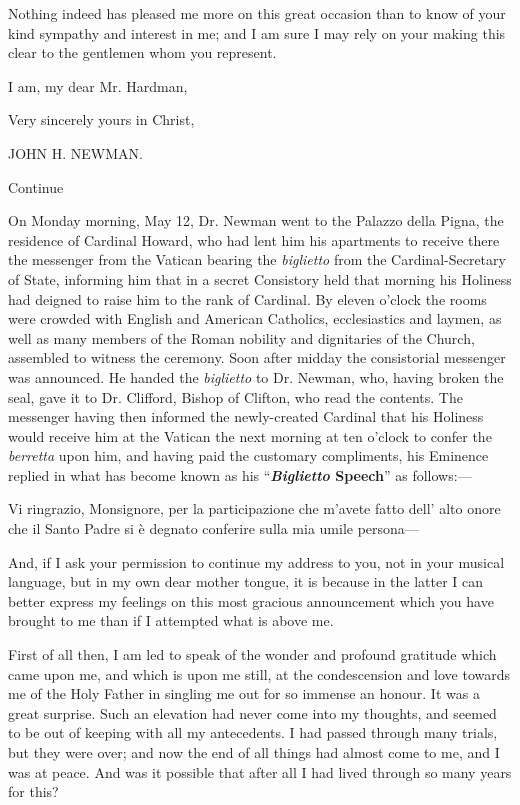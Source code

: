 Nothing indeed has pleased me more on this great occasion than
to know of your kind sympathy and interest in me; and I am sure I may
rely on your making this clear to the gentlemen whom you represent.

I am, my dear Mr. Hardman,

Very sincerely yours in Christ,

JOHN H. NEWMAN.

Continue


On Monday morning, May 12, Dr. Newman went to the Palazzo della
Pigna, the residence of Cardinal Howard, who had lent him his
apartments to receive there the messenger from the Vatican bearing the
\emph{biglietto} from the Cardinal-Secretary of State, informing him
that in a secret Consistory held that morning his Holiness had deigned
to raise him to the rank of Cardinal. By eleven o'clock the rooms were
crowded with English and American Catholics, ecclesiastics and laymen,
as well as many members of the Roman nobility and dignitaries of the
Church, assembled to witness the ceremony. Soon after midday the
consistorial messenger was announced. He handed the \emph{biglietto}
to Dr. Newman, who, having broken the seal, gave it to Dr. Clifford,
Bishop of Clifton, who read the contents. The messenger having then
informed the newly-created Cardinal that his Holiness would receive
him at the Vatican the next morning at ten o'clock to confer the \emph{berretta}
upon him, and having paid the customary compliments, his Eminence
replied in what has become known as his ``\textbf{\emph{Biglietto}
Speech}'' as follows:—

Vi ringrazio, Monsignore, per la participazione che m'avete fatto
dell' alto onore che il Santo Padre si è degnato conferire sulla
mia umile persona—

And, if I ask your permission to continue my address to you, not in
your musical language, but in my own dear mother tongue, it is because
in the latter I can better express my feelings on this most gracious
announcement which you have brought to me than if I attempted what is
above me.

First of all then, I am led to speak of the wonder and profound
gratitude which came upon me, and which is upon me still, at the
condescension and love towards me of the Holy Father in singling me
out for so immense an honour. It was a great surprise. Such an
elevation had never come into my thoughts, and seemed to be out of
keeping with all my antecedents. I had passed through many trials, but
they were over; and now the end of all things had almost come to me,
and I was at peace. And was it possible that after all I had lived
through so many years for this?

